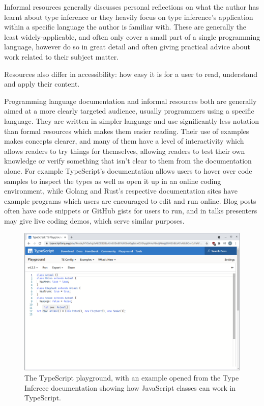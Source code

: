 \documentclass[a4paper,fleqn,oneside,12pt]{report}
\begin{document}
Informal resources generally discusses personal reflections on what the author has learnt about type inference or they heavily focus on type inference’s application within a specific language the author is familiar with. These are generally the least widely-applicable, and often only cover a small part of a single programming language, however do so in great detail and often giving practical advice about work related to their subject matter.

Resources also differ in accessibility: how easy it is for a user to read, understand and apply their content.

Programming language documentation and informal resources both are generally aimed at a more clearly targeted audience, usually programmers using a specific language. They are written in simpler language and use significantly less notation than formal resources which makes them easier reading. Their use of examples makes concepts clearer, and many of them have a level of interactivity which allows readers to try things for themselves, allowing readers to test their own knowledge or verify something that isn’t clear to them from the documentation alone. For example TypeScript’s documentation allows users to hover over code samples to inspect the types as well as open it up in an online coding environment, while Golang and Rust’s respective documentation sites have example programs which users are encouraged to edit and run online. Blog posts often have code snippets or GitHub gists for users to run, and in talks presenters may give live coding demos, which serve similar purposes.

\begin{figure}[h!]
  \centering
  \includegraphics[width=1.000\linewidth]{images/image8.png}
  \caption{The TypeScript playground, with an example opened from the Type Inferece documentation showing how JavaScript classes can work in TypeScript.}
\end{figure}
\end{document}
